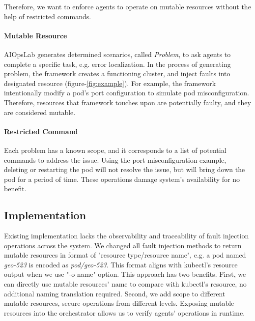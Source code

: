 Therefore, we want to enforce agents to operate on mutable resources without the help of restricted commands.

\paragraph{Mutable Resource} AIOpsLab generates determined scenarios, called \textit{Problem}, to ask agents to complete a specific task, e.g. error localization. In the process of generating problem, the framework creates a functioning cluster, and inject faults into designated resource (figure-\ref{fig:example}). For example, the framework intentionally modify a pod's port configuration to simulate pod misconfiguration. Therefore, resources that framework touches upon are potentially faulty, and they are considered mutable.

\paragraph{Restricted Command} Each problem has a known scope, and it corresponds to a list of potential commands to address the issue. Using the port misconfiguration example, deleting or restarting the pod will not resolve the issue, but will bring down the pod for a period of time. These operations damage system's availability for no benefit.





\subsection{Implementation}

Existing implementation lacks the observability and traceability of fault injection operations across the system. We changed all fault injection methods to return mutable resources in format of "resource type/resource name", e.g. a pod named \textit{geo-523} is encoded as \textit{pod/geo-523}. This format aligns with kubectl's resource output when we use "-o name" option. This approach has two benefits. First, we can directly use mutable resources' name to compare with kubectl's resource, no additional naming translation required. Second, we add scope to different mutable resources, secure operations from different levels. Exposing mutable resources into the orchestrator allows us to verify agents' operations in runtime.

